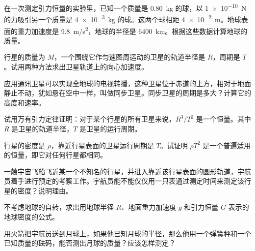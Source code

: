 \begin{Exercise}
\begin{question}
	\item 在一次测定引力恒量的实验里，已知一个质量是 \qty{0.80}{kg} 的球，以 \qty{1e-10}{N} 的力吸引另一个质量是 \qty{4e-3}{kg} 的球。这两个球相距 \qty{4e-2}{m}。地球表面的重力加速度是 \qty{9.8}{m/s^2}，地球的半径是 \qty{6400}{km}。根据这些数据计算地球的质量。
	\item 行星的质量为 $M$，一个围绕它作匀速图周运动的卫星的轨道半径是 $R$，周期是 $T$。试用两种方法求出卫星轨道上的向心加速度。	
	\item 应用通讯卫星可以实现全地球的电视转播，这种卫星位于赤道的上方，相对于地面静止不动，犹如悬在空中一样，叫做同步卫星。同步卫星的周期是多大？计算它的高度和速率。
	\item 试用万有引力定律证明：对于某个行星的所有卫星来说，$R^3/T^2$ 是一个恒量。其中 $R$ 是卫星的轨道半径，$T$ 是卫星的运行周期。
	\item 行星的密度是 $\rho$，靠近行星表面的卫星运行周期是 $T$。试证明 $\rho T^2$ 是一个普遍适用的恒量，即它对任何行星都相同。
	\item 一艘宇宙飞船飞近某一个不知名的行星，并进入靠近该行星表面的圆形轨道，宇航员着手进行预定的考察工作。宇航员能不能仅仅用一只表通过测定时间来测定该行星的密度？说明理由。
	\item 不考虑地球的自转，求出用地球半径 $R$、地面重力加速度 $g$ 和引力恒量 $G$ 表示的地球密度的公式。
	\item 用火箭把宇航员送到月球上，如果他已知月球的半径，那么他用一个弹簧秤和一个已知质量的砝码，能否测出月球的质量？应该怎样测定？	
\end{question}
\end{Exercise}